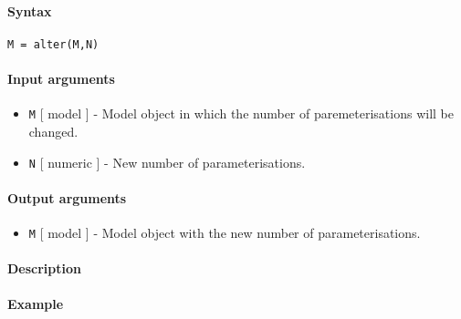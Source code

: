 


	\paragraph{Syntax}

\begin{verbatim}
M = alter(M,N)
\end{verbatim}

\paragraph{Input arguments}

\begin{itemize}
\item
  \texttt{M} {[} model {]} - Model object in which the number of
  paremeterisations will be changed.
\item
  \texttt{N} {[} numeric {]} - New number of parameterisations.
\end{itemize}

\paragraph{Output arguments}

\begin{itemize}
\itemsep1pt\parskip0pt
\item
  \texttt{M} {[} model {]} - Model object with the new number of
  parameterisations.
\end{itemize}

\paragraph{Description}

\paragraph{Example}


